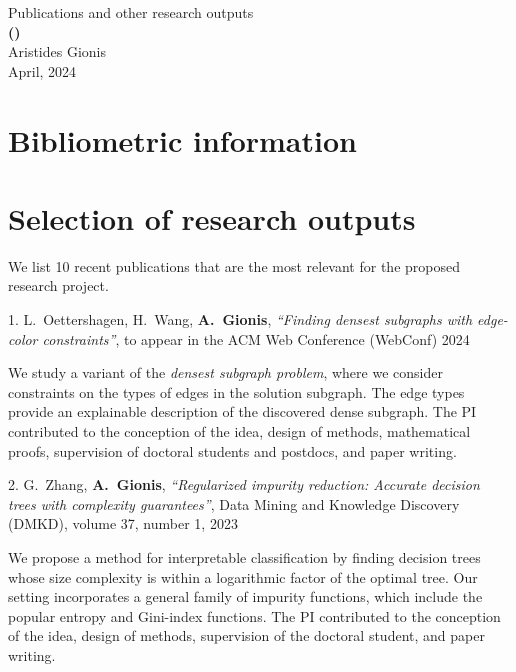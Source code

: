 \documentclass[a4paper,11pt]{article}
\begin{document}
\begin{center} 
{\Large Publications and other research outputs} \vspace{3mm}\\
{\Large\bf {\proposaltitle} {\sc (}{\acronymtitle}{\sc )}}  \vspace{3mm} \\
{\Large Aristides Gionis}  \vspace{2.5mm} \\
{\large April, 2024}
\end{center}

\section{Bibliometric information}


\section{Selection of research outputs}

We list 10 recent publications that are the most relevant for the proposed research project. 
\medskip

\biblistn


\item[{1.}]
{L.\ Oettershagen, H.\ Wang, \textbf{A.\ Gionis}},
{\em ``Finding densest subgraphs with edge-color constraints''},
to appear in the ACM Web Conference (WebConf) 2024
%
\item[]
We study a variant of the \emph{densest subgraph problem}, 
where we consider constraints on the types of edges in the solution subgraph.
The edge types provide an explainable description of the discovered dense subgraph.
The PI contributed to the conception of the idea, 
design of methods, mathematical proofs, supervision of doctoral students and postdocs, and paper writing.


\textbibspace

\item[{2.}]
{G.\ Zhang, \textbf{A.\ Gionis}},
{\em ``Regularized impurity reduction: Accurate decision trees with complexity guarantees''},
Data Mining and Knowledge Discovery (DMKD), 
volume 37, number 1, 2023
%
\item[]
We propose a method for interpretable classification by finding decision trees
whose size complexity is within a logarithmic factor of the optimal tree.
Our setting incorporates a general family of impurity functions, 
which include the popular entropy and Gini-index functions.
The PI contributed to the conception of the idea, 
design of methods, supervision of the doctoral student, and paper writing.
\end{document}
